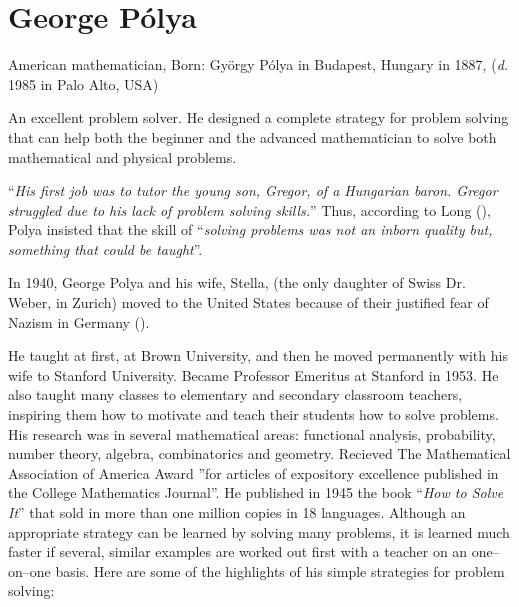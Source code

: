 \documentclass[12pt]{article}
\theoremstyle{plain}
\theoremstyle{definition}
\numberwithin{equation}{section}
\begin{document}
\section{George P\'olya} 
 American mathematician, 
 Born: Gy\"orgy P\'olya in Budapest, Hungary in 1887, ({\em d.} 1985 in Palo Alto, USA)

 An excellent problem solver. He designed a complete strategy for problem solving
that can help both the beginner and the advanced mathematician to solve both mathematical
and physical problems. 

 ``{\em His first job was to tutor the young son, Gregor, of a Hungarian baron. Gregor struggled due to his lack of problem solving skills.}'' Thus, according to Long (\cite{LTDW1996}), Polya  insisted that the skill of ``{\em solving problems was not an inborn quality but, something that could be taught}''.

 In 1940, George Polya and his wife, Stella, (the only daughter of Swiss Dr. Weber, in Zurich) moved to the United States because of their justified fear of Nazism in Germany (\cite{LTDW1996}). 

 He taught at first, at Brown University, and then he moved permanently with his wife 
to Stanford University. Became Professor Emeritus at Stanford in 1953. He also taught many classes to elementary and secondary classroom teachers, inspiring them how to motivate and teach their students how to solve problems.
His research was in several mathematical areas: functional analysis, probability, number theory, algebra, combinatorics and geometry.
Recieved The Mathematical Association of America Award ''for articles of expository excellence published in the College Mathematics Journal''.
He published in 1945 the book ``{\em How to Solve It}'' that sold in more than one million copies in 18 languages.  Although an appropriate strategy can be learned by solving many problems, it is learned much faster if several, similar examples are worked out first with a teacher on an one--on--one basis. Here are some of the highlights of his simple strategies for problem solving:
\end{document}
